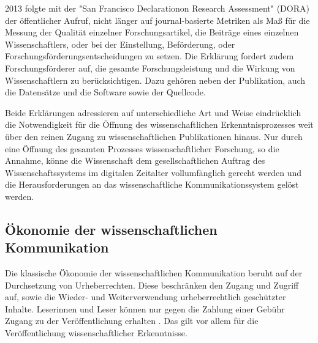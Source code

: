 2013 folgte mit der "San Francisco Declarationon Research Assessment" (DORA) \cite{DORA_2013} der öffentlicher Aufruf, nicht länger auf journal-basierte Metriken als Maß für die Messung der Qualität einzelner Forschungsartikel, die Beiträge eines einzelnen Wissenschaftlers, oder bei der Einstellung, Beförderung, oder Forschungsförderungsentscheidungen zu setzen. Die Erklärung fordert zudem Forschungsförderer auf, die gesamte Forschungsleistung und die Wirkung von Wissenschaftlern zu berücksichtigen. Dazu gehören neben der Publikation, auch die Datensätze und die Software sowie der Quellcode.

Beide Erklärungen adressieren auf unterschiedliche Art und Weise eindrücklich die Notwendigkeit für die Öffnung des wissenschaftlichen Erkenntnisprozesses weit über den reinen Zugang zu wissenschaftlichen Publikationen hinaus. Nur durch eine Öffnung des gesamten Prozesses wissenschaftlicher Forschung, so die Annahme, könne die Wissenschaft dem gesellschaftlichen Auftrag des Wissenschaftssystems im digitalen Zeitalter vollumfänglich gerecht werden und die Herausforderungen an das wissenschaftliche Kommunikationssystem gelöst werden.

\subsection{Ökonomie der wissenschaftlichen Kommunikation}

Die klassische Ökonomie der wissenschaftlichen Kommunikation beruht auf der Durchsetzung von Urheberrechten. Diese beschränken den Zugang und Zugriff auf, sowie die Wieder- und Weiterverwendung urheberrechtlich geschützter Inhalte. Leserinnen und Leser können nur gegen die Zahlung einer Gebühr Zugang zu der Veröffentlichung erhalten \cite{CREATe_2014}. Das gilt vor allem für die Veröffentlichung wissenschaftlicher Erkenntnisse.

